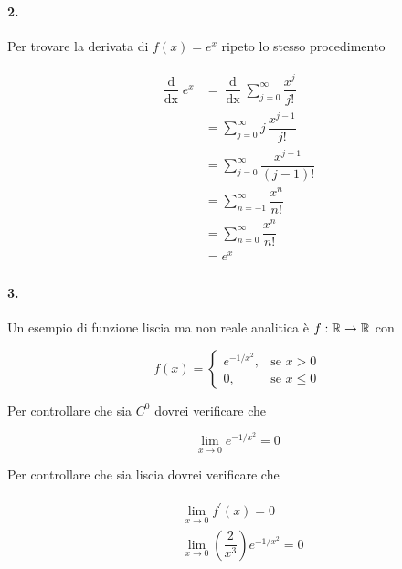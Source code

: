 \paragraph{2.}

Per trovare la derivata di $ f(x) = e^{x} $ ripeto lo stesso procedimento

\begin{align}
	\begin{split}
		\dfrac{\operatorname{d}}{\operatorname{dx}} e^{x} &= \dfrac{\operatorname{d}}{\operatorname{dx}} \sum_{j=0}^{\infty}\dfrac{x^{j}}{j!}\\
		&= \sum_{j=0}^{\infty} j \, \dfrac{x^{j-1}}{j!}\\
		&= \sum_{j=0}^{\infty} \dfrac{x^{j-1}}{(j-1)!}\\
		&= \sum_{n=-1}^{\infty} \dfrac{x^{n}}{n!}\\
		&= \sum_{n=0}^{\infty} \dfrac{x^{n}}{n!}\\
		&= e^{x}
	\end{split}
\end{align}

\paragraph{3.}

Un esempio di funzione liscia ma non reale analitica è $ f : \mathbb{R} \to \mathbb{R} $ con

\begin{equation}
	f(x) = \begin{cases}
		e^{-1/x^{2}},& \text{se } x > 0\\
		0,& \text{se } x \leqslant 0
	\end{cases}
\end{equation}

Per controllare che sia $ C^{0} $ dovrei verificare che

\begin{equation}
	\lim_{x \to 0} e^{-1/x^{2}} = 0
\end{equation}

Per controllare che sia liscia dovrei verificare che

\begin{align}
	\begin{split}
		&\lim_{x \to 0} f^{\prime} (x) = 0\\
		&\lim_{x \to 0} \left(\dfrac{2}{x^{3}}\right) e^{-1/x^{2}} = 0
	\end{split}
\end{align}

